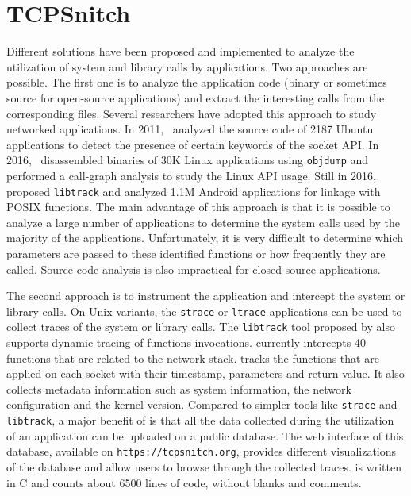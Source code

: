 \section{TCPSnitch}\label{sec:tcpsnitch}

Different solutions have been proposed and implemented to analyze the
utilization of system and library calls by applications. Two
approaches are possible. The first one is to analyze the
application code (binary or sometimes source for open-source
applications) and extract the interesting calls from the corresponding
files. Several researchers have adopted this approach to study
networked applications. In 2011,~\cite{Komu:Sockets} analyzed the source
code of 2187 Ubuntu applications to detect the presence of certain keywords
of the socket API. In 2016,~\cite{Tsai:LinuxAPI} disassembled
binaries of 30K Linux applications using \texttt{objdump} and performed
a call-graph analysis to study the Linux API usage. Still in 2016,
~\cite{Atlidakis:POSIX} proposed \texttt{libtrack} and analyzed 1.1M Android
applications for linkage with POSIX functions. The main advantage of this
approach is that it is possible to analyze a large number of applications to
determine the system calls used by the majority of the applications.
Unfortunately, it is very difficult to determine
which parameters are passed to these identified functions or how
frequently they are called. Source code analysis is also impractical for
closed-source applications.

The second approach is to instrument the application and intercept the
system or library calls. On Unix variants, the \texttt{strace} or
\texttt{ltrace} applications can be used to collect traces of the
system or library calls. The \texttt{libtrack} tool proposed by
\cite{Atlidakis:POSIX} also supports dynamic tracing of functions invocations.
\tcpsnitch currently intercepts 40 functions that are related to the network
stack. \tcpsnitch tracks the functions that are applied on each
socket with their timestamp, parameters and return value.
It also collects metadata information such as system information,
the network configuration and the kernel version. Compared to simpler
tools like \texttt{strace} and \texttt{libtrack}, a major benefit of
\tcpsnitch is that all the data collected during the utilization of an
application can be uploaded on a public database. The web interface of this 
database, available on \texttt{https://tcpsnitch.org}, provides different
visualizations of the database and allow users to browse through the
collected traces. \tcpsnitch is written in C and
counts about 6500 lines of code, without blanks and comments.

